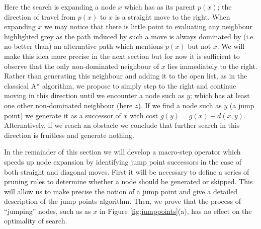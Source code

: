 Here the search is expanding a node $x$ which has as its parent $p(x)$;
the direction of travel from $p(x)$ to $x$ is a straight move to the right.
When expanding $x$ we may notice that there is little point to evaluating any
neighbour highlighted grey as the path induced by such a move is always
dominated by (i.e. no better than) an alternative path which mentions 
$p(x)$ but not $x$.
We will make this idea more precise in the next section but for now it is 
sufficient to observe that the only non-dominated neighbour of $x$ 
lies immediately to the right.
Rather than generating this neighbour and adding it to the open list,
as in the classical A* algorithm, we propose 
to simply step to the right and continue moving in this direction until we
encounter a node such as $y$; which has at least one other non-dominated
neighbour (here $z$). 
If we find a node such as $y$ (a jump point) we generate it as a successor 
of $x$ with cost $g(y) = g(x) + d(x, y)$.
Alternatively, if we reach an obstacle we conclude that further search in this
direction is fruitless and generate nothing.
\par
In the remainder of this section we will develop a macro-step operator which 
speeds up node expansion by identifying jump point successors in the case of
both straight and diagonal moves. First it will be necessary to define a series of
pruning rules to determine whether a node should be generated 
or skipped. 
This will allow us to make precise the notion of a jump point and 
give a detailed description of the jump points algorithm.
Then, we prove that the process of ``jumping'' nodes, such as as $x$ in 
Figure \ref{fig:jumppoints}(a), has no effect on the optimality of search.





